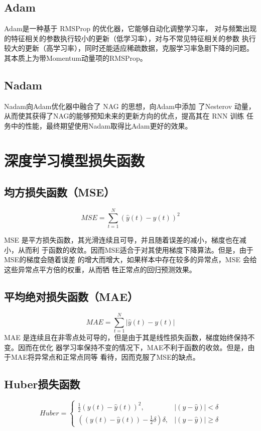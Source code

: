 \documentclass[AutoFakeBold]{LZUThesis}
\begin{document}
\subsection{Adam}
Adam\cite{kingma2014adam}是一种基于 RMSProp 的优化器，它能够自动化调整学习率，
对与频繁出现的特征相关的参数执行较小的更新（低学习率），对与不常见特征相关的参数
执行较大的更新（高学习率），同时还能适应稀疏数据，克服学习率急剧下降的问题。
其本质上为带Momentum动量项的RMSProp。

\subsection{Nadam}
Nadam\cite{dozat2016incorporating}向Adam优化器中融合了 NAG 的思想，向Adam中添加
了Nesterov 动量，从而使其获得了NAG的能够预知未来的更新方向的优点，提高其在 RNN 训练
任务中的性能，最终期望使用Nadam取得比Adam更好的效果。

\section{深度学习模型损失函数}
\subsection{均方损失函数（MSE）}
$$MSE=\sum_{t=1}^{N}\left(\hat{y}\left(t\right)-y\left(t\right)\right)^2$$

MSE 是平方损失函数，其光滑连续且可导，并且随着误差的减小，梯度也在减小，从而利
于函数的收敛。因而MSE适合于对其使用梯度下降算法。但是，由于MSE的梯度会随着误差
的增大而增大，如果样本中存在较多的异常点，MSE 会给这些异常点平方倍的权重，从而牺
牲正常点的回归预测效果。

\subsection{平均绝对损失函数（MAE）}
$$MAE=\sum_{t=1}^{N}\left|\hat{y}\left(t\right)-y\left(t\right)\right|$$
MAE 是连续且在非零点处可导的，但是由于其是线性损失函数，梯度始终保持不变。因而在优化
器学习率保持不变的情况下，MAE不利于函数的收敛。但是，由于MAE将异常点和正常点同等
看待，因而克服了MSE的缺点。

\subsection{Huber损失函数}
$$
Huber=
\left\{\begin{matrix}
    \frac{1}{2}(y\left(t\right) - \hat{y}\left(t\right))^{2}, & \left | (y - \hat{y})  \right | < \delta\\
    ((y\left(t\right) - \hat{y}\left(t\right)) - \frac1 2 \delta)\delta, & \left | (y - \hat{y})  \right | \geq \delta
\end{matrix}\right.
$$
\end{document}
